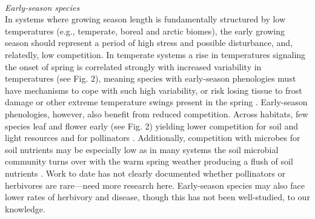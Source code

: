 \documentclass[11pt,a4paper,oneside]{article}
\begin{document}
\\
\noindent \emph{Early-season species}\\
In systems where growing season length is fundamentally structured by low temperatures (e.g., temperate, boreal and arctic biomes), the early growing season should represent a period of high stress and possible disturbance, and, relatedly, low competition. In temperate systems a rise in temperatures signaling the onset of spring is correlated strongly with increased variability in temperatures (see Fig. 2), meaning species with early-season phenologies must have mechanisms to cope with such high variability, or risk losing tissue to frost damage or other extreme temperature swings present in the spring \citep{Linkosalo2000,Augspurger:2009gj}. Early-season phenologies, however, also benefit from reduced competition. Across habitats, few species leaf and flower early (see Fig. 2) yielding lower competition for soil and light resources and for pollinators \citep{Mosquin1971}. Additionally, competition with microbes for soil nutrients may be especially low as in many systems the soil microbial community turns over with the warm spring weather producing a flush of soil nutrients \citep{Zak:1990ar}. Work to date has not clearly documented whether pollinators \citep{Mosquin1971,filella2013} or herbivores are rare---need more research here. Early-season species may also face lower rates of herbivory and disease, though this has not been well-studied, to our knowledge.\\
\\
\end{document}
